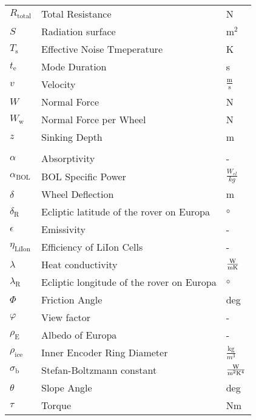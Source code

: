\begin{longtable}[l]{lll}
\(R_\text{total}\)		&	Total Resistance							& N								\\
\(S\)					&	Radiation surface							& m$^2$							\\
${T}_\text{s}$ 				&	Effective Noise Tmeperature					& K								\\
$t_\text{e}$			&	Mode Duration								& s								\\
\(v\)					&	Velocity									& \(\frac{\text{m}}{\text{s}}\)	\\
\(W\)					&	Normal Force 								& N								\\
\(W_\text{w}\)			&	Normal Force per Wheel						& N								\\
\(z\)					&	Sinking Depth								& m								\\
				&											& 							\\


$\alpha$				&	Absorptivity								& -  							\\
$\alpha_\text{BOL}$		&	BOL Specific Power							& $\frac{W_{el}}{kg}$			\\
\(\delta\)				&	Wheel Deflection							& m								\\
$\delta_\text{R}$		&	Ecliptic latitude of the rover on Europa	& $\circ$						\\
\(\epsilon\)			&	Emissivity 									&	-							\\
$\eta_\text{LiIon}$		&	Efficiency of LiIon Cells					& -								\\
$\lambda$				&	Heat conductivity							& $\frac{{\rm W}}{{\rm m} {\rm K}}$			\\
$\lambda_\text{R}$		&	Ecliptic longitude of the rover on Europa	& $\circ$						\\
\(\Phi\)				&	Friction Angle								& deg							\\
$\varphi$				&	View factor									& -								\\
\(\rho_\text{E}\)		&	Albedo of Europa			  				& -								\\
\(\rho_\text{ice}\)		&	Inner Encoder Ring Diameter  				&	\(\frac{\text{kg}}{m^3}\)	\\
$\sigma_\text{b}$ 		&	Stefan-Boltzmann constant					& $\frac{{\rm W}}{{\rm m}^2{\rm K}^4}$ 		\\
\(\theta\)				&	Slope Angle									& deg							\\
\(\tau\)				&	Torque										& Nm							\\




\end{longtable}

